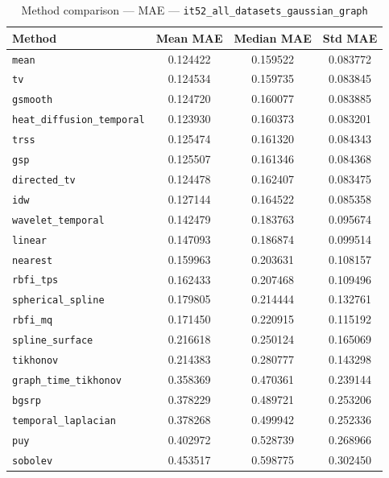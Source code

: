 \begin{table}[ht]
\centering
\caption{Method comparison — MAE — \texttt{it52_all_datasets_gaussian_graph}}
\label{tab:mae_it52_all_datasets_gaussian_graph}
\begin{tabular}{lccc}
\hline
Method & Mean MAE & Median MAE & Std MAE \\
\hline
\texttt{mean} & 0.124422 & 0.159522 & 0.083772 \\
\texttt{tv} & 0.124534 & 0.159735 & 0.083845 \\
\texttt{gsmooth} & 0.124720 & 0.160077 & 0.083885 \\
\texttt{heat_diffusion_temporal} & 0.123930 & 0.160373 & 0.083201 \\
\texttt{trss} & 0.125474 & 0.161320 & 0.084343 \\
\texttt{gsp} & 0.125507 & 0.161346 & 0.084368 \\
\texttt{directed_tv} & 0.124478 & 0.162407 & 0.083475 \\
\texttt{idw} & 0.127144 & 0.164522 & 0.085358 \\
\texttt{wavelet_temporal} & 0.142479 & 0.183763 & 0.095674 \\
\texttt{linear} & 0.147093 & 0.186874 & 0.099514 \\
\texttt{nearest} & 0.159963 & 0.203631 & 0.108157 \\
\texttt{rbfi_tps} & 0.162433 & 0.207468 & 0.109496 \\
\texttt{spherical_spline} & 0.179805 & 0.214444 & 0.132761 \\
\texttt{rbfi_mq} & 0.171450 & 0.220915 & 0.115192 \\
\texttt{spline_surface} & 0.216618 & 0.250124 & 0.165069 \\
\texttt{tikhonov} & 0.214383 & 0.280777 & 0.143298 \\
\texttt{graph_time_tikhonov} & 0.358369 & 0.470361 & 0.239144 \\
\texttt{bgsrp} & 0.378229 & 0.489721 & 0.253206 \\
\texttt{temporal_laplacian} & 0.378268 & 0.499942 & 0.252336 \\
\texttt{puy} & 0.402972 & 0.528739 & 0.268966 \\
\texttt{sobolev} & 0.453517 & 0.598775 & 0.302450 \\
\hline
\end{tabular}
\end{table}
